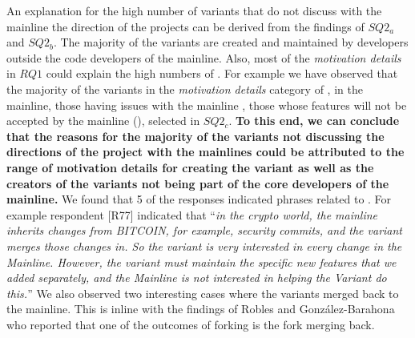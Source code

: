 An explanation for the high number of variants that do not discuss with the mainline the direction of the projects can be derived from the findings of $SQ2_{a}$ and $SQ2_{b}$. The majority of the variants are created and maintained by developers outside the code developers of the mainline. Also, most of the \emph{motivation details} in $RQ1$ could explain the high numbers of . For example we have observed that the majority of the variants in the \emph{motivation details} category of ,  in the mainline, those having issues with the mainline , those whose features will not be accepted by the mainline (), selected   in $SQ2_{c}$. \textbf{To this end, we can conclude that the reasons for the majority of the variants not discussing the directions of the project with the mainlines could be attributed to the range of motivation details for creating the variant as well as the creators of the variants not being part of the core developers of the mainline.}
We found that 5 of the responses indicated phrases related to . For example respondent [R77] indicated that ``\emph{in the crypto world, the mainline inherits changes from BITCOIN, for example, security commits, and the variant merges those changes in. So the variant is very interested in every change in the Mainline. However, the variant must maintain the specific new features that we added separately, and the Mainline is not interested in helping the Variant do this.}''
We also observed two interesting cases where the variants merged back to the mainline. This is inline with the findings of Robles and Gonz{\'a}lez-Barahona~\cite{Gregorio:2012} who reported that one of the outcomes of forking is the fork merging back.

